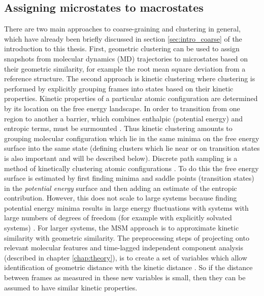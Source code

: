 \subsection{Assigning microstates to macrostates}



There are two main approaches to coarse-graining and clustering in general, which have already been briefly discussed in section \ref{sec:intro_coarse} of the introduction to this thesis. First, geometric clustering can be used to assign snapshots from molecular dynamics (MD) trajectories to microstates based on their geometric similarity, for example the root mean square deviation from a reference structure. The second approach is kinetic clustering where clustering is performed by explicitly grouping frames into states based on their kinetic properties.  Kinetic properties of a particular atomic configuration are determined by its location on the free energy landscape. In order to transition from one region to another a barrier, which combines enthalpic (potential energy) and entropic terms, must be surmounted \cite{wales_2004}.  Thus kinetic clustering amounts to grouping molecular configuration which lie in the same minima on the free energy surface into the same state (defining clusters which lie near or on transition states is also important and will be described below). Discrete path sampling is a method of kinetically clustering atomic configurations \cite{walesEnergyLandscapesCalculating2006}. To do this the free energy surface is estimated  by first finding minima and saddle points (transition states) in the \emph{potential energy} surface and then adding an estimate of the entropic contribution. However, this does not scale to large systems because finding potential energy minima results in large energy fluctuations with systems with large numbers of degrees of freedom (for example with explicitly solvated systems) \cite{noeTransitionNetworksModeling2008}. For larger systems, the MSM approach is to approximate kinetic similarity with geometric similarity. The preprocessing steps of projecting onto relevant molecular features and time-lagged independent component analysis (described in chapter \ref{chap:theory}), is to create a set of variables which allow identification of geometric distance with the kinetic distance \cite{noeKineticDistanceKinetic2015}. So if the distance between frames as measured in these new variables is small, then they can be assumed to have similar kinetic properties.  

